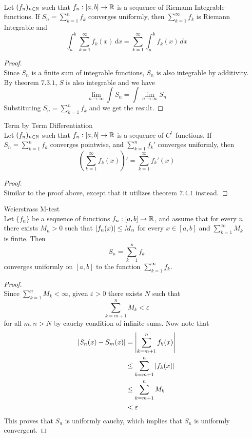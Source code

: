 \documentclass[a4paper]{article}
\begin{document}
\begin{thm}{}{}\\ Let $(f_n)_{n\in\mathbb{N}}$ such that $f_n:[a,b]\to\mathbb{R}$ is a sequence of Riemann Integrable functions. If $S_n=\sum_{k=1}^nf_k$ converges uniformly, then $\sum_{k=1}^\infty f_k$ is Riemann Integrable and $$\int_a^b\sum_{k=1}^\infty f_k(x)\,dx=\sum_{k=1}^\infty\int_a^bf_k(x)\,dx$$ 
\begin{proof}\\ Since $S_n$ is a finite sum of integrable functions, $S_n$ is also integrable by additivity. By theorem $7.3.1$, $S$ is also integrable and we have $$\lim_{n\to\infty}\int S_n=\int\lim_{n\to\infty}S_n$$ Substituting $S_n=\sum_{k=1}^nf_k$ and we get the result. 
\end{proof}
\end{thm}

\begin{thm}{Term by Term Differentiation}{}\\ Let $(f_n)_{n\in\mathbb{N}}$ such that $f_n:[a,b]\to\mathbb{R}$ is a sequence of $C^1$ functions. If $S_n=\sum_{k=1}^nf_k$ converges pointwise, and $\sum_{k=1}^nf_k'$ converges uniformly, then $$\left(\sum_{k=1}^\infty f_k(x)\right)'=\sum_{k=1}^\infty f_k'(x)$$ 
\begin{proof}\\ Similar to the proof above, except that it utilizes theorem $7.4.1$ instead. 
\end{proof}
\end{thm}

\begin{thm}{Weierstrass M-test}{}\\ Let $\{f_n\}$ be a sequence of functions $f_n:[a,b]\to\mathbb{R}$, and assume that for every $n$ there exists $M_n>0$ such that $\abs{f_n(x)}\leq M_n$ for every $x\in[a,b]$ and $\sum_{k=1}^\infty M_k$ is finite. Then $$S_n=\sum_{k=1}^n f_k$$ converges uniformly on $[a,b]$ to the function $\sum_{k=1}^\infty f_k$. 
\begin{proof}\\
Since $\sum_{k=1}^nM_k<\infty$, given $\varepsilon>0$ there exists $N$ such that $$\sum_{k=m+1}^nM_k<\varepsilon$$ for all $m,n>N$ by cauchy condition of infinite sums. Now note that
\begin{align*}
\abs{S_n(x)-S_m(x)}&=\abs{\sum_{k=m+1}^nf_k(x)}\\
&\leq\sum_{k=m+1}^n\abs{f_k(x)}\\
&\leq\sum_{k=m+1}^nM_k\\
&<\varepsilon
\end{align*}
This proves that $S_n$ is uniformly cauchy, which implies that $S_n$ is uniformly convergent. 
\end{proof}
\end{thm}
\end{document}
